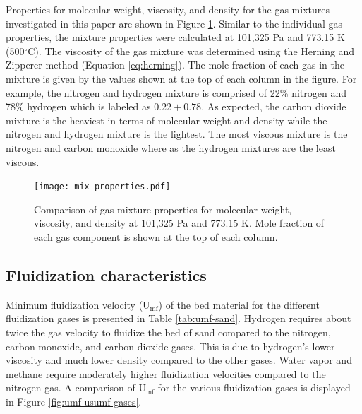 Properties for molecular weight, viscosity, and density for the gas mixtures investigated in this paper are shown in Figure \ref{fig:mix-properties}. Similar to the individual gas properties, the mixture properties were calculated at 101,325 Pa and 773.15 K (500$^\circ$C). The viscosity of the gas mixture was determined using the Herning and Zipperer method (Equation \ref{eq:herning}). The mole fraction of each gas in the mixture is given by the values shown at the top of each column in the figure. For example, the nitrogen and hydrogen mixture is comprised of 22\% nitrogen and 78\% hydrogen which is labeled as $0.22 + 0.78$. As expected, the carbon dioxide mixture is the heaviest in terms of molecular weight and density while the nitrogen and hydrogen mixture is the lightest. The most viscous mixture is the nitrogen and carbon monoxide where as the hydrogen mixtures are the least viscous.

\begin{figure}[H]
    \centering
    \texttt{[image: mix-properties.pdf]}
    \caption{Comparison of gas mixture properties for molecular weight, viscosity, and density at 101,325 Pa and 773.15 K. Mole fraction of each gas component is shown at the top of each column.}
    \label{fig:mix-properties}
\end{figure}


\subsection{Fluidization characteristics}\label{sec:fluidization-charact}

Minimum fluidization velocity (U$_\text{mf}$) of the bed material for the different fluidization gases is presented in Table \ref{tab:umf-sand}. Hydrogen requires about twice the gas velocity to fluidize the bed of sand compared to the nitrogen, carbon monoxide, and carbon dioxide gases. This is due to hydrogen's lower viscosity and much lower density compared to the other gases. Water vapor and methane require moderately higher fluidization velocities compared to the nitrogen gas. A comparison of U$_\text{mf}$ for the various fluidization gases is displayed in Figure \ref{fig:umf-usumf-gases}.

